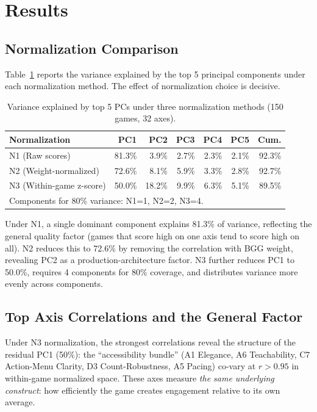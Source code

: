 \section{Results}
\label{sec:results}

\subsection{Normalization Comparison}

Table~\ref{tab:pca_comparison} reports the variance explained by the top 5 principal
components under each normalization method. The effect of normalization choice is decisive.

\begin{table}[h]
\centering
\caption{Variance explained by top 5 PCs under three normalization methods (150 games, 32 axes).}
\label{tab:pca_comparison}
\begin{tabular}{lrrrrrr}
\toprule
\textbf{Normalization} & \textbf{PC1} & \textbf{PC2} & \textbf{PC3} & \textbf{PC4} & \textbf{PC5} & \textbf{Cum.} \\
\midrule
N1 (Raw scores)          & 81.3\% & 3.9\% & 2.7\% & 2.3\% & 2.1\% & 92.3\% \\
N2 (Weight-normalized)   & 72.6\% & 8.1\% & 5.9\% & 3.3\% & 2.8\% & 92.7\% \\
N3 (Within-game z-score) & 50.0\% & 18.2\% & 9.9\% & 6.3\% & 5.1\% & 89.5\% \\
\bottomrule
\multicolumn{7}{l}{\footnotesize Components for 80\% variance: N1=1, N2=2, N3=4.}
\end{tabular}
\end{table}

Under N1, a single dominant component explains 81.3\% of variance, reflecting the
general quality factor (games that score high on one axis tend to score high on all).
N2 reduces this to 72.6\% by removing the correlation with BGG weight, revealing
PC2 as a production-architecture factor. N3 further reduces PC1 to 50.0\%, requires
4 components for 80\% coverage, and distributes variance more evenly across components.

\subsection{Top Axis Correlations and the General Factor}

Under N3 normalization, the strongest correlations reveal the structure of the
residual PC1 (50\%): the ``accessibility bundle'' (A1 Elegance, A6 Teachability,
C7 Action-Menu Clarity, D3 Count-Robustness, A5 Pacing) co-vary at $r > 0.95$
in within-game normalized space. These axes measure \emph{the same underlying
construct}: how efficiently the game creates engagement relative to its own average.

